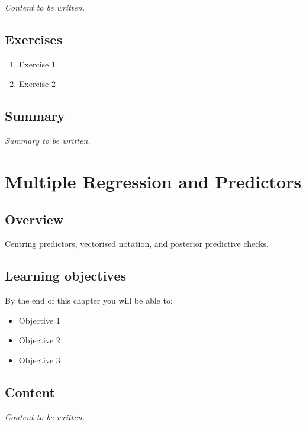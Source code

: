 \documentclass[
  11pt,
  a4paper,
  oneside,
  openany]{scrbook}
\providecommand{\tightlist}{%
  \setlength{\itemsep}{0pt}\setlength{\parskip}{0pt}}\usepackage{longtable,booktabs,array}
\begin{document}
\emph{Content to be written.}

\section{Exercises}\label{exercises-3}

\begin{enumerate}
\def\labelenumi{\arabic{enumi}.}
\tightlist
\item
  Exercise 1
\item
  Exercise 2
\end{enumerate}

\section{Summary}\label{summary-3}

\emph{Summary to be written.}

\chapter{Multiple Regression and
Predictors}\label{multiple-regression-and-predictors}

\section{Overview}\label{overview-4}

Centring predictors, vectorised notation, and posterior predictive
checks.

\section{Learning objectives}\label{learning-objectives-4}

By the end of this chapter you will be able to:

\begin{itemize}
\tightlist
\item[$\square$]
  Objective 1
\item[$\square$]
  Objective 2
\item[$\square$]
  Objective 3
\end{itemize}

\section{Content}\label{content-3}

\emph{Content to be written.}
\end{document}
